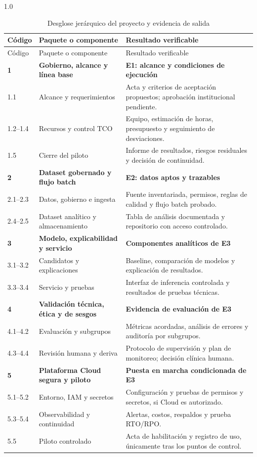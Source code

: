 \documentclass[12pt,a4paper]{article}
\begin{document}
\begin{spacing}{1.0}
\small
\begin{longtable}{@{}p{1.25cm}p{4.05cm}p{9.0cm}@{}}
  \caption{Desglose jerárquico del proyecto y evidencia de salida}\label{tab:act2-edt}\\
  \toprule
  Código & Paquete o componente & Resultado verificable \\
  \midrule
  \endfirsthead
  \toprule
  Código & Paquete o componente & Resultado verificable \\
  \midrule
  \endhead
  \textbf{1} & \textbf{Gobierno, alcance y línea base} & \textbf{E1: alcance y condiciones de ejecución} \\
  1.1 & Alcance y requerimientos & Acta y criterios de aceptación propuestos; aprobación institucional pendiente. \\
  1.2--1.4 & Recursos y control TCO & Equipo, estimación de horas, presupuesto y seguimiento de desviaciones. \\
  1.5 & Cierre del piloto & Informe de resultados, riesgos residuales y decisión de continuidad. \\
  \textbf{2} & \textbf{Dataset gobernado y flujo batch} & \textbf{E2: datos aptos y trazables} \\
  2.1--2.3 & Datos, gobierno e ingesta & Fuente inventariada, permisos, reglas de calidad y flujo batch probado. \\
  2.4--2.5 & Dataset analítico y almacenamiento & Tabla de análisis documentada y repositorio con acceso controlado. \\
  \textbf{3} & \textbf{Modelo, explicabilidad y servicio} & \textbf{Componentes analíticos de E3} \\
  3.1--3.2 & Candidatos y explicaciones & Baseline, comparación de modelos y explicación de resultados. \\
  3.3--3.4 & Servicio y pruebas & Interfaz de inferencia controlada y resultados de pruebas técnicas. \\
  \textbf{4} & \textbf{Validación técnica, ética y de sesgos} & \textbf{Evidencia de evaluación de E3} \\
  4.1--4.2 & Evaluación y subgrupos & Métricas acordadas, análisis de errores y auditoría por subgrupos. \\
  4.3--4.4 & Revisión humana y deriva & Protocolo de supervisión y plan de monitoreo; decisión clínica humana. \\
  \textbf{5} & \textbf{Plataforma Cloud segura y piloto} & \textbf{Puesta en marcha condicionada de E3} \\
  5.1--5.2 & Entorno, IAM y secretos & Configuración y pruebas de permisos y secretos, si Cloud es autorizado. \\
  5.3--5.4 & Observabilidad y continuidad & Alertas, costos, respaldos y prueba RTO/RPO. \\
  5.5 & Piloto controlado & Acta de habilitación y registro de uso, únicamente tras los puntos de control. \\
  \bottomrule
\end{longtable}
\normalsize
\end{spacing}
\end{document}
